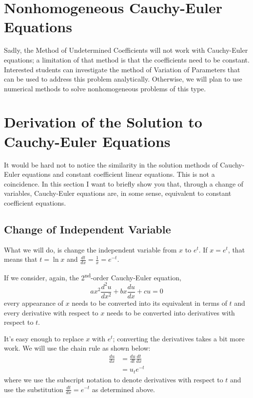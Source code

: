 \section{Nonhomogeneous Cauchy-Euler Equations}
Sadly, the Method of Undetermined Coefficients will not work with Cauchy-Euler equations; a limitation of that method is that the coefficients need to be constant. Interested students can investigate the method of Variation of Parameters that can be used to address this problem analytically.  Otherwise, we will plan to use numerical methods to solve nonhomogeneous problems of this type.

\section{Derivation of the Solution to Cauchy-Euler Equations}
It would be hard not to notice the similarity in the solution methods of Cauchy-Euler equations and constant coefficient linear equations.  This is not a coincidence.  In this section I want to briefly show you that, through a change of variables, Cauchy-Euler equations are, in some sense, equivalent to constant coefficient equations.

\subsection{Change of Independent Variable}
What we will do, is change the independent variable from $x$ to $e^t$.  If $x = e^t$, that means that $t = \ln{x}$ and $\frac{dt}{dx} = \frac{1}{x} = e^{-t}$.

If we consider, again, the 2\textsuperscript{nd}-order Cauchy-Euler equation,
\begin{equation*}
ax^2\frac{d^2u}{dx^2}+bx\frac{du}{dx}+cu = 0
\end{equation*}
every appearance of $x$ needs to be converted into its equivalent in terms of $t$ and every derivative with respect to $x$ needs to be converted into derivatives with respect to $t$.

It's easy enough to replace $x$ with $e^t$; converting the derivatives takes a bit more work.  We will use the chain rule as shown below:
\begin{align*}
\frac{du}{dx} &= \frac{du}{dt} \frac{dt}{dx} \\
&=u_t e^{-t}
\end{align*}
where we use the subscript notation to denote derivatives with respect to $t$ and use the substitution $\frac{dt}{dx}=e^{-t}$ as determined above.

